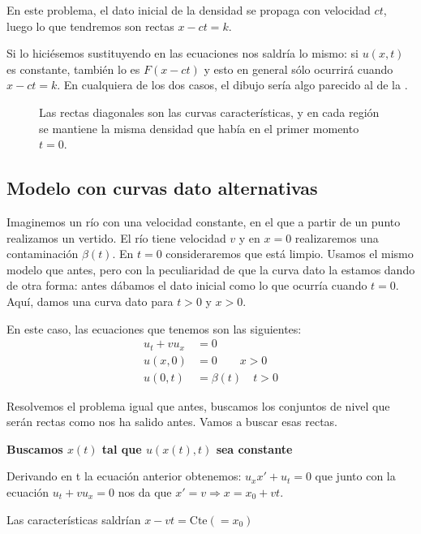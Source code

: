 			En este problema, el dato inicial de la densidad se propaga con velocidad $ct$, luego lo que tendremos son rectas $x - ct = k$.

			Si lo hiciésemos sustituyendo en las ecuaciones nos saldría lo mismo: si $u(x,t)$ es constante, también lo es $F(x-ct)$ y esto en general sólo ocurrirá cuando $x - ct = k$. En cualquiera de los dos casos, el dibujo sería algo parecido al de la .

			\begin{figure}
			\centering
			\caption{Las rectas diagonales son las curvas características, y en cada región se mantiene la misma densidad que había en el primer momento $t = 0$.}
			\label{fig:ConjNivelCochesSimple}
			\end{figure}



	\subsection{Modelo con curvas dato alternativas}
		\label{sec:CurvaDatoRara}

		Imaginemos un río con una velocidad constante, en el que a partir de un punto realizamos un vertido. El río tiene velocidad $v$ y en ${x=0}$ realizaremos una contaminación $\beta(t)$. En ${t=0}$ consideraremos que está limpio. Usamos el mismo modelo que antes, pero con la peculiaridad de que la curva dato la estamos dando de otra forma: antes dábamos el dato inicial como lo que ocurría cuando ${t = 0}$. Aquí, damos una curva dato para $t > 0$ y $x > 0$.

		En este caso, las ecuaciones que tenemos son las siguientes:
		\begin{align*}
		u_t + vu_x &= 0 \\
		u(x,0) &= 0 \qquad x>0 \\
		u(0,t) &= \beta(t)\quad t>0
		\end{align*}

		Resolvemos el problema igual que antes, buscamos los conjuntos de nivel que serán rectas como nos ha salido antes. Vamos a buscar esas rectas.

		\textbf{Buscamos $x(t)$ tal que $u(x(t),t)$ sea constante}

		Derivando en t la ecuación anterior obtenemos: $u_x x' + u_t = 0$ que junto con la ecuación $u_t + v u_x = 0$ nos da que $x' = v \Rightarrow x = x_0 + vt $.

		Las características saldrían \(x-vt = \text{Cte}(=x_0) \label{eq:rio_vcte}\)

